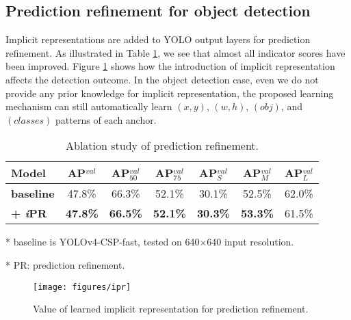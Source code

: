 \documentclass[10pt,twocolumn,letterpaper]{article}
\begin{document}
\subsection{Prediction refinement for object detection}
\label{sec:pr}

Implicit representations are added to YOLO output layers for prediction refinement. As illustrated in Table \ref{table:e2}, we see that almost all indicator scores have been improved. Figure \ref{fig:ipr} shows how the introduction of implicit representation affects the detection outcome. In the object detection case, even we do not provide any prior knowledge for implicit representation, the proposed learning mechanism can still automatically learn $(x, y)$, $(w, h)$, $(obj)$, and $(classes)$ patterns of each anchor.

\begin{table}[h]
	\centering
	\begin{threeparttable}[h]
		\footnotesize
		\caption{Ablation study of prediction refinement.}
		\label{table:e2}
		\setlength\tabcolsep{4.5pt}
		\begin{tabular}{lcccccc}
			\toprule
			\textbf{Model} & \textbf{AP$^{val}$} & \textbf{AP$^{val}_{50}$} & \textbf{AP$^{val}_{75}$} & \textbf{AP$^{val}_{S}$} & \textbf{AP$^{val}_{M}$} & \textbf{AP$^{val}_{L}$} \\				
			\midrule
			\textbf{baseline} & 47.8\% & 66.3\% & 52.1\% & 30.1\% & 52.5\% & 62.0\% \\
			\textbf{+ \textit{i}PR} & \textbf{47.8\%} & \textbf{66.5\%} & \textbf{52.1\%} & \textbf{30.3\%} & \textbf{53.3\%} & 61.5\% \\
			\bottomrule
		\end{tabular}
		\begin{tablenotes}[flushleft]
			\footnotesize
			\item[*] baseline is YOLOv4-CSP-fast, tested on 640$\times$640 input resolution.
			\item[*] PR: prediction refinement.
		\end{tablenotes}
	\end{threeparttable}
\end{table}

\begin{figure}[h]
\begin{center}
	\texttt{[image: figures/ipr]}
\end{center}
\caption{Value of learned implicit representation for prediction refinement.}
\label{fig:ipr}
\end{figure}
\end{document}
